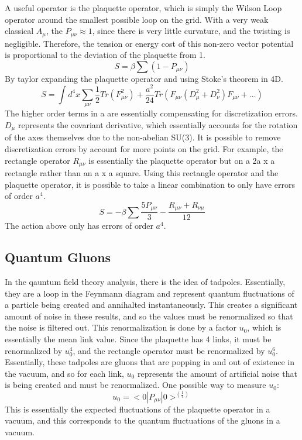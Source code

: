 \documentclass{article}
\begin{document}
A useful operator is the plaquette operator, which is simply the Wilson Loop operator around the smallest possible loop on the grid.
With a very weak classical $A_{\mu}$, the $P_{\mu \nu} \approx 1$, since there is very little curvature, and the twisting is negligible.
Therefore, the tension or energy cost of this non-zero vector potential is proportional to the deviation of the plaquette from 1. 
\begin{equation}
    S = \beta \sum (1 - P_{\mu \nu})
\end{equation}  
By taylor expanding the plaquette operator and using Stoke's theorem in 4D.
\begin{equation}
    S = \int d^4x \sum_{\mu \nu}{\frac{1}{2}Tr(F^2_{\mu \nu}) + \frac{a^2}{24}Tr(F_{\mu \nu} (D^2_{\mu} + D^2_{\nu})F_{\mu \nu} + \dots)}
\end{equation}
The higher order terms in a are essentially compensating for discretization errors. $D_{\mu}$ represents the covariant derivative, which essentially accounts for the rotation of the axes themselves due to the non-abelian SU(3).
It is possible to remove discretization errors by account for more points on the grid. For example, the rectangle operator $R_{\mu \nu}$ is essentially the plaquette operator but on a 2a x a rectangle rather than an a x a square.
Using this rectangle operator and the plaquette operator, it is possible to take a linear combination to only have errors of order $a^4$.
\begin{equation}
    S = -\beta \sum \frac{5P_{\mu \nu}}{3} - \frac{R_{\mu \nu} + R_{\nu \mu}}{12}
\end{equation}
The action above only has errors of order $a^4$.
\subsection{Quantum Gluons}
In the qauntum field theory analysis, there is the idea of tadpoles. Essentially, they are a loop in the Feynmann diagram and represent quantum fluctuations of a particle being created and annihalted instantaneously. 
This creates a significant amount of noise in these results, and so the values must be renormalized so that the noise is filtered out.
This renormalization is done by a factor $u_0$, which is essentially the mean link value. Since the plaquette has 4 links, it must be renormalized by $u^4_0$, and the rectangle operator must be renormalized by $u^6_0$.
Essentially, these tadpoles are gluons that are popping in and out of existence in the vacuum, and so for each link, $u_0$ represents the amount of artificial noise that is being created and must be renormalized.
One possible way to measure $u_0$: 
\begin{equation}
    u_0 = <0|P_{\mu \nu}|0>^(\frac{1}{4})
\end{equation}
This is essentially the expected fluctuations of the plaquette operator in a vacuum, and this corresponds to the quantum fluctuations of the gluons in a vacuum. \newline
\end{document}
